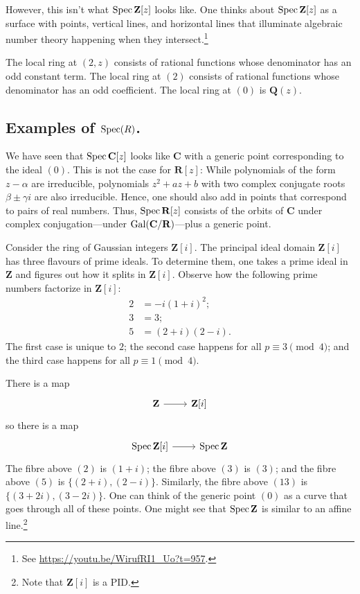 \documentclass [11 pt, oneside] {article}
\begin{document}
However, this isn't what $\operatorname{Spec} \mathbf{Z}[z]$ looks like. One thinks about $\operatorname{Spec} \mathbf{Z}[z]$ as a surface with points, vertical lines, and horizontal lines that illuminate algebraic number theory happening when they intersect.\footnote{See \url{https://youtu.be/WirufRI1_Uo?t=957}.} 

The local ring at $(2,z)$ consists of rational functions whose denominator has an odd constant term. The local ring at $(2)$ consists of rational functions whose denominator has an odd coefficient. The local ring at $(0)$ is $\mathbf{Q}(z)$.

\subsection{Examples of \texorpdfstring{$\operatorname{Spec}(R)$}{Spec (R)}.}
\begin{example}[ ]\label{}\text{}
We have seen that $\operatorname{Spec} \mathbf{C}[z]$ looks like $\mathbf{C}$ with a generic point corresponding to the ideal $(0)$. This is not the case for $\mathbf{R}[z]$: While polynomials of the form $z-\alpha$ are irreducible, polynomials $z^2 + az + b$ with two complex conjugate roots $\beta\pm \gamma i$ are also irreducible. Hence, one should also add in points that correspond to pairs of real numbers. Thus, $\operatorname{Spec} \mathbf{R}[z]$ consists of the orbits of $\mathbf{C}$ under complex conjugation---under $\operatorname{Gal}(\mathbf{C}/\mathbf{R})$---plus a generic point.
\end{example}

\begin{example}[ ]\label{}\text{}
Consider the ring of Gaussian integers $\mathbf{Z}[i]$. The principal ideal domain $\mathbf{Z}[i]$ has three flavours of prime ideals. To determine them, one takes a prime ideal in $\mathbf{Z}$ and figures out how it splits in $\mathbf{Z}[i]$. Observe how the following prime numbers factorize in $\mathbf{Z}[i]$:
\begin{align*}
	2 &= -i (1+i)^2;\\ 
	3 &= 3;\\
	5 &= (2+i) (2-i).
\end{align*}
The first case is unique to $2$; the second case happens for all $p\equiv 3\pmod 4$; and the third case happens for all $p\equiv 1\pmod 4$.

There is a map 
\[
\begin{tikzcd}
\mathbf{Z}\ar[r]& \mathbf{Z}[i]
\end{tikzcd}
\]
so there is a map 
\[
\begin{tikzcd}
\Spec \mathbf{Z}[i]\ar[r]& \Spec \mathbf{Z}
\end{tikzcd}
\]
The fibre above $(2)$ is $(1+i)$; the fibre above $(3)$ is $(3)$; and the fibre above $(5)$ is $\{(2+i),  (2-i)\}$. Similarly, the fibre above $(13)$ is $\{(3+2i),  (3-2i)\}$. One can think of the generic point $(0)$ as a curve that goes through all of these points. One might see that $\operatorname{Spec} \mathbf{Z}$ is similar to an affine line.\footnote{Note that $\mathbf{Z}[i]$ is a PID.}
\end{example}
\end{document}
